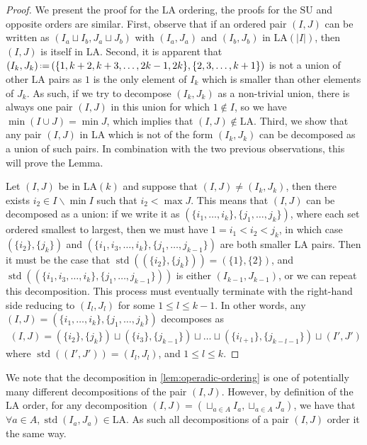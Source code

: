 \documentclass{amsart}
\theoremstyle{definition}
\newcommand{\ssm}{\smallsetminus} %
\newcommand{\eqdef}{\mbox{\,\raisebox{0.2ex}{\scriptsize\ensuremath{\mathrm:}}\ensuremath{=}\,}} %
\DeclareMathOperator{\std}{std}
\newcommand{\SU}{\mathrm{SU}}
\newcommand{\LA}{\mathrm{LA}}
\begin{document}
\begin{proof}
We present the proof for the $\LA$ ordering, the proofs for the $\SU$ and opposite orders are similar.
First, observe that if an ordered pair $(I,J)$ can be written as $(I_a \sqcup I_b, J_a \sqcup J_b)$ with $(I_a,J_a)$ and $(I_b,J_b)$ in $\LA(|I|)$, then $(I,J)$ is itself in $\LA$.
Second, it is apparent that $(I_k,J_k) \eqdef (\{1,k+2,k+3,\dots,2k-1,2k\}, \{2,3,\dots,k+1\})$ is not a union of other $\LA$ pairs as $1$ is the only element of $I_k$ which is smaller than other elements of $J_k$.
As such, if we try to decompose $(I_k,J_k)$ as a non-trivial union, there is always one pair $(I,J)$ in this union for which $1 \notin I$, so we have $\min ( I \cup J) = \min J$, which implies that $(I,J) \notin \LA$.
Third, we show that any pair $(I,J)$ in $\LA$ which is not of the form $(I_k,J_k)$ can be decomposed as a union of such pairs. 
In combination with the two previous observations, this will prove the Lemma. 

Let $(I,J)$ be in $\LA(k)$ and suppose that $(I,J) \neq (I_k,J_k)$, then there exists $i_2 \in I\ssm \min I$ such that $i_2 < \max J$.
This means that $(I,J)$ can be decomposed as a union: if we write it as $(\{i_1,\dots,i_k\},\{j_1,\dots,j_k\})$, where each set ordered smallest to largest, then we must have $1=i_1<i_2<j_k$, in which case $(\{i_2\},\{j_k\})$ and $(\{i_1,i_3,\dots,i_k\},\{j_1,\dots,j_{k-1}\})$ are both smaller $\LA$ pairs.
Then it must be the case that $\std((\{i_2\},\{j_k\})) = (\{1\},\{2\})$, and $\std((\{i_1,i_3,\dots,i_k\},\{j_1,\dots,j_{k-1}\}))$ is either $(I_{k-1},J_{k-1})$, or we can repeat this decomposition.
This process must eventually terminate with the right-hand side reducing to $(I_l,J_l)$ for some $1 \leq l \leq k-1$.
In other words, any $(I,J) = (\{i_1,\dots,i_k\}, \{j_1,\dots,j_k\})$ decomposes as
\begin{align*}
	(I,J) = (\{i_2\},\{j_k\}) \sqcup (\{i_3\},\{j_{k-1}\}) \sqcup \dots \sqcup (\{i_{l+1} \},\{j_{k-l-1} \}) \sqcup (I',J')
\end{align*}
where $\std((I',J')) = (I_l,J_l)$, and $1\leq l \leq k$.
\end{proof}

We note that the decomposition in \cref{lem:operadic-ordering} is one of potentially many different decompositions of the pair $(I,J)$. 
However, by definition of the $\LA$ order, for any decomposition $(I,J) = (\sqcup_{a\in A} I_a, \sqcup_{a \in A} J_a)$, we have that $\forall a \in A, \std(I_a, J_a) \in \LA$.
As such all decompositions of a pair $(I,J)$ order it the same way.
\end{document}

